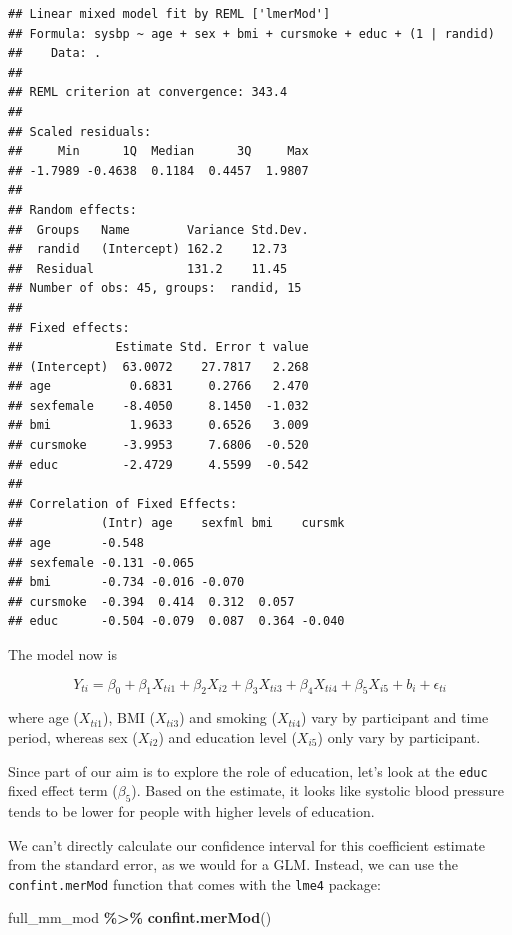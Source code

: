 \documentclass[
]{book}
\newenvironment{Shaded}{\begin{snugshade}}{\end{snugshade}}
\newcommand{\FunctionTok}[1]{\textcolor[rgb]{0.13,0.29,0.53}{\textbf{#1}}}
\newcommand{\NormalTok}[1]{#1}
\newcommand{\SpecialCharTok}[1]{\textcolor[rgb]{0.81,0.36,0.00}{\textbf{#1}}}
\begin{document}
\begin{verbatim}
## Linear mixed model fit by REML ['lmerMod']
## Formula: sysbp ~ age + sex + bmi + cursmoke + educ + (1 | randid)
##    Data: .
## 
## REML criterion at convergence: 343.4
## 
## Scaled residuals: 
##     Min      1Q  Median      3Q     Max 
## -1.7989 -0.4638  0.1184  0.4457  1.9807 
## 
## Random effects:
##  Groups   Name        Variance Std.Dev.
##  randid   (Intercept) 162.2    12.73   
##  Residual             131.2    11.45   
## Number of obs: 45, groups:  randid, 15
## 
## Fixed effects:
##             Estimate Std. Error t value
## (Intercept)  63.0072    27.7817   2.268
## age           0.6831     0.2766   2.470
## sexfemale    -8.4050     8.1450  -1.032
## bmi           1.9633     0.6526   3.009
## cursmoke     -3.9953     7.6806  -0.520
## educ         -2.4729     4.5599  -0.542
## 
## Correlation of Fixed Effects:
##           (Intr) age    sexfml bmi    cursmk
## age       -0.548                            
## sexfemale -0.131 -0.065                     
## bmi       -0.734 -0.016 -0.070              
## cursmoke  -0.394  0.414  0.312  0.057       
## educ      -0.504 -0.079  0.087  0.364 -0.040
\end{verbatim}

The model now is

\[
Y_{ti} = \beta_{0} + \beta_{1}X_{ti1} + \beta_{2}X_{i2} + \beta_{3}X_{ti3} + \beta_{4}X_{ti4} + \beta_{5}X_{i5} + b_{i} + \epsilon_{ti}
\]

where age (\(X_{ti1}\)), BMI (\(X_{ti3}\)) and smoking (\(X_{ti4}\)) vary by participant
and time period, whereas sex (\(X_{i2}\)) and education level (\(X_{i5}\)) only vary by
participant.

Since part of our aim is to explore the role of education, let's look at the
\texttt{educ} fixed effect term (\(\beta_{5}\)). Based on the estimate, it looks like systolic blood
pressure tends to be lower for people with higher levels of education.

We can't directly calculate our confidence interval for this coefficient estimate
from the standard error, as we would for a GLM. Instead, we can use the
\texttt{confint.merMod} function that comes with the \texttt{lme4} package:

\begin{Shaded}
\begin{Highlighting}[]
\NormalTok{full\_mm\_mod }\SpecialCharTok{\%\textgreater{}\%} 
  \FunctionTok{confint.merMod}\NormalTok{()}
\end{Highlighting}
\end{Shaded}
\end{document}
